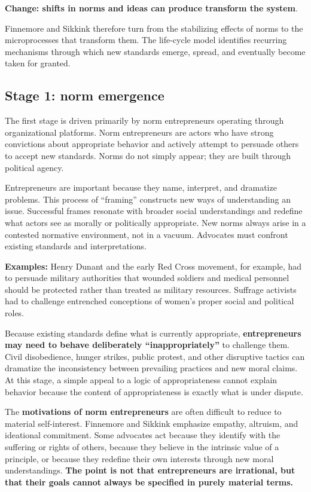\textbf{Change: shifts in norms and ideas can  produce transform the system}.

Finnemore and Sikkink therefore turn from the stabilizing effects of norms to the microprocesses that transform them. The life-cycle model identifies recurring mechanisms through which new standards emerge, spread, and eventually become taken for granted.

\subsection{Stage 1: norm emergence}

The first stage is driven primarily by norm entrepreneurs operating through organizational platforms. Norm entrepreneurs are actors who have strong convictions about appropriate behavior and actively attempt to persuade others to accept new standards. Norms do not simply appear; they are built through political agency.

Entrepreneurs are important because they name, interpret, and dramatize problems. This process of ``framing'' constructs new ways of understanding an issue. Successful frames resonate with broader social understandings and redefine what actors see as morally or politically appropriate. New norms always arise in a contested normative environment, not in a vacuum. Advocates must confront existing standards and interpretations.

\textbf{Examples:} Henry Dunant and the early Red Cross movement, for example, had to persuade military authorities that wounded soldiers and medical personnel should be protected rather than treated as military resources. Suffrage activists had to challenge entrenched conceptions of women's proper social and political roles.

Because existing standards define what is currently appropriate, \textbf{entrepreneurs may need to behave deliberately ``inappropriately''} to challenge them. Civil disobedience, hunger strikes, public protest, and other disruptive tactics can dramatize the inconsistency between prevailing practices and new moral claims. At this stage, a simple appeal to a logic of appropriateness cannot explain behavior because the content of appropriateness is exactly what is under dispute.

The \textbf{motivations of norm entrepreneurs} are often difficult to reduce to material self-interest. Finnemore and Sikkink emphasize empathy, altruism, and ideational commitment. Some advocates act because they identify with the suffering or rights of others, because they believe in the intrinsic value of a principle, or because they redefine their own interests through new moral understandings. \textbf{The point is not that entrepreneurs are irrational, but that their goals cannot always be specified in purely material terms.}

